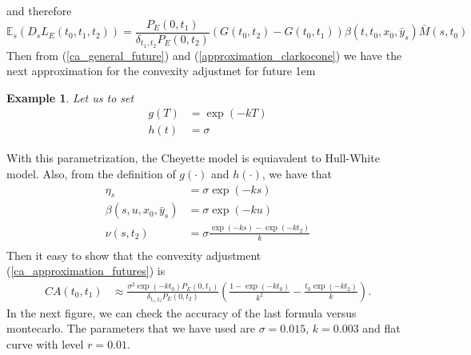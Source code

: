 \documentclass[a4paper,10pt]{article}
\newtheorem{example}[theorem]{Example}
\newcommand{\1}{\mathbf{1}}
\begin{document}
and therefore
\begin{equation}\label{approximation_clarkocone}
\mathbb{E}_s\left( D_s L_{E}(t_0,t_1,t_2) \right) = \frac{P_{E}(0,t_1)}{\delta_{t_1,t_2} P_{E}(0,t_2)} \left(G(t_0,t_2)  - G(t_0,t_1)\right)\beta(t,t_0,x_0,\bar{y}_s)\bar{M}(s,t_0)
\end{equation}
Then from (\ref{ca_general_future}) and (\ref{approximation_clarkocone}) we have the next approximation for the convexity adjustmet for future
\hspace{1cm}
\fboxsep1em

\begin{example}\label{example_ca_future}
Let us to set 
\begin{align*}
g(T) &= \exp(-kT) \\
h(t) &= \sigma
\end{align*}
\end{example}
With this parametrization, the Cheyette model is equiavalent to Hull-White model. Also, from the definition of $g(\cdot)$ and $h(\cdot)$, we have that
\begin{align*}
\eta_s &= \sigma \exp(-ks)\\
\beta(s,u, x_0, \bar{y}_s) &= \sigma \exp(-ku) \\
\nu(s,t_2) &= \sigma \frac{\exp(-ks) - \exp(-kt_2)}{k}\\
\end{align*}
Then it easy to show that the convexity adjustment (\ref{ca_approximation_futures}) is
\begin{align*}
CA(t_0,t_1) & \approx \frac{\sigma^{2} \exp(-k t_0)  P_{E}(0,t_1)}{\delta_{t_1,t_2} P_{E}(0,t_2)} \left(\frac{1 - \exp(- k t_0)}{k^{2}} - \frac{t_0 \exp(-k t_2)}{k} \right).   
\end{align*}
\newpage
In the next figure, we can check the accuracy of the last formula versus montecarlo. The parameters that we have used are $\sigma=0.015$, $k=0.003$ and flat curve with level $r=0.01$.
\end{document}
